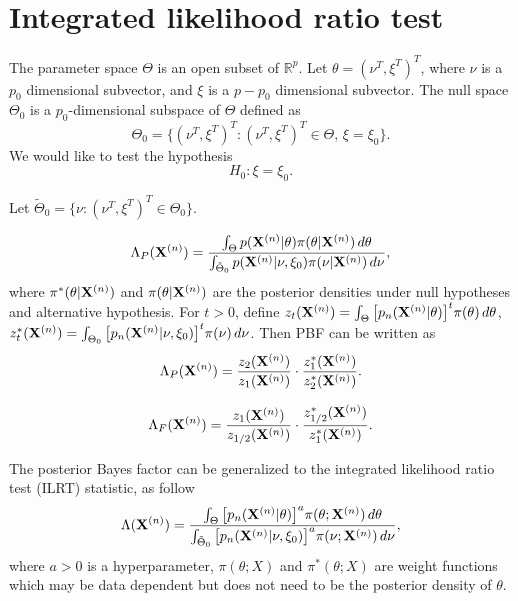 \documentclass[3p]{elsarticle}
\theoremstyle{plain}
\theoremstyle{definition}
\theoremstyle{remark}
\begin{document}
\section{Integrated likelihood ratio test}
The parameter space $\Theta$ is an open subset of $\mathbb{R}^{p}$.
Let $\theta=(\nu^T,\xi^T)^T$, where $\nu$ is a $p_0$ dimensional subvector, and $\xi$ is a $p-p_0$ dimensional subvector.
The null space $\Theta_0$ is a $p_0$-dimensional subspace of $\Theta$ defined as
\begin{equation}
    \Theta_0=\{(\nu^T,\xi^T)^T:(\nu^T,\xi^T)^T\in\Theta, \, \xi=\xi_0\}.
\end{equation}
 We would like to test the hypothesis
\begin{equation}
H_0:\xi=\xi_0.
\end{equation}

Let $\tilde{\Theta}_0=\{\nu: (\nu^T,\xi^T)^T\in \Theta_0\}$.

\begin{equation*}
    \Lambda_{P}(\mathbf{X}^{(n)})=\frac{\int_{\Theta} p(\mathbf{X}^{(n)}|\theta)\pi(\theta|\mathbf{X}^{(n)})\, d\theta}{\int_{\tilde{\Theta}_0}p(\mathbf{X}^{(n)}|\nu,\xi_0)\pi(\nu|\mathbf{X}^{(n)})\, d\nu},
\end{equation*}
where $\pi^*(\theta|\mathbf{X}^{(n)})$ and $\pi(\theta|\mathbf{X}^{(n)})$ are the posterior densities under null hypotheses and alternative hypothesis.
For $t>0$, define $z_t(\mathbf{X}^{(n)})=\int_{\Theta}\big[p_n(\mathbf{X}^{(n)}|\theta)\big]^t \pi(\theta)\, d\theta$,
 $z_t^*(\mathbf{X}^{(n)})=\int_{\Theta_0}\big[p_n(\mathbf{X}^{(n)}|\nu,\xi_0)\big]^t \pi(\nu)\, d\nu$.
Then PBF can be written as
$$
    \Lambda_{P}(\mathbf{X}^{(n)})=
    \frac{z_{2}(\mathbf{X}^{(n)})}{z_{1}(\mathbf{X}^{(n)})}\cdot \frac{z_{1}^*(\mathbf{X}^{(n)})}{z_{2}^*(\mathbf{X}^{(n)})}.
$$

\begin{equation*}
    \Lambda_{F}(\mathbf{X}^{(n)})=
    \frac{z_{1}(\mathbf{X}^{(n)})}{z_{1/2}(\mathbf{X}^{(n)})}\cdot \frac{z_{1/2}^*(\mathbf{X}^{(n)})}{z_{1}^*(\mathbf{X}^{(n)})}.
\end{equation*}



 The posterior Bayes factor can be generalized to the integrated likelihood ratio test (ILRT) statistic, as follow  
\begin{equation}
    \Lambda (\mathbf{X}^{(n)})=\frac{\int_{\Theta} \big[p_n(\mathbf{X}^{(n)}|\theta)\big]^{a}\pi(\theta;\mathbf{X}^{(n)})\,d\theta}{\int_{\tilde{\Theta}_0} \big[p_n(\mathbf{X}^{(n)}|\nu,\xi_0)\big]^{a}\pi(\nu;\mathbf{X}^{(n)})\,d\nu},
\end{equation}
where $a>0$ is a hyperparameter, $\pi(\theta;X)$ and $\pi^*(\theta;X)$ are weight functions which may be data dependent but does not need to be the posterior density of $\theta$.
\end{document}
